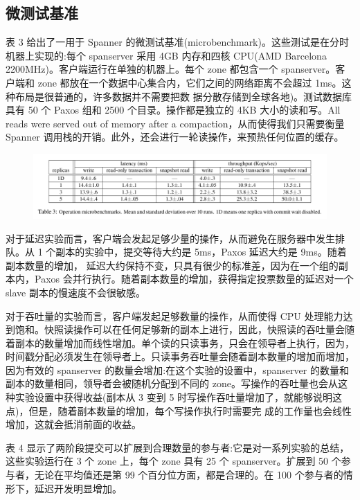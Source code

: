 \documentclass[letterpaper,twocolumn,10pt]{article}
\begin{document}
\subsection{微测试基准}
表 3 给出了一用于 Spanner 的微测试基准(microbenchmark)。这些测试是在分时机器上实现的:每个 spanserver 采用 4GB 内存和四核 CPU(AMD Barcelona 2200MHz)。客户端运行在单独的机器上。每个 zone 都包含一个 spanserver。客户端和 zone 都放在一个数据中心集合内，它们之间的网络距离不会超过 1ms。这种布局是很普通的，许多数据并不需要把数 据分散存储到全球各地)。测试数据库具有 50 个 Paxos 组和 2500 个目录。操作都是独立的 4KB 大小的读和写。All reads were served out of memory after a compaction，从而使得我们只需要衡量 Spanner 调用栈的开销。此外，还会进行一轮读操作，来预热任何位置的缓存。

\begin{figure}[htbp]
\begin{center}
\includegraphics[width=1\textwidth]{./table_3.png}
\label{Table3}
\end{center}
\end{figure}

对于延迟实验而言，客户端会发起足够少量的操作，从而避免在服务器中发生排队。从 1 个副本的实验中，提交等待大约是 5ms，Paxos 延迟大约是 9ms。随着副本数量的增加， 延迟大约保持不变，只具有很少的标准差，因为在一个组的副本内，Paxos 会并行执行。随着副本数量的增加，获得指定投票数量的延迟对一个 slave 副本的慢速度不会很敏感。

对于吞吐量的实验而言，客户端发起足够数量的操作，从而使得 CPU 处理能力达到饱和。快照读操作可以在任何足够新的副本上进行，因此，快照读的吞吐量会随着副本的数量增加而线性增加。单个读的只读事务，只会在领导者上执行，因为，时间戳分配必须发生在领导者上。只读事务吞吐量会随着副本数量的增加而增加，因为有效的 spanserver 的数量会增加:在这个实验的设置中，spanserver 的数量和副本的数量相同，领导者会被随机分配到不同的 zone。写操作的吞吐量也会从这种实验设置中获得收益(副本从 3 变到 5 时写操作吞吐量增加了，就能够说明这点)，但是，随着副本数量的增加，每个写操作执行时需要完 成的工作量也会线性增加，这就会抵消前面的收益。

表 4 显示了两阶段提交可以扩展到合理数量的参与者:它是对一系列实验的总结，这些实验运行在 3 个 zone 上，每个 zone 具有 25 个 spanserver。扩展到 50 个参与者，无论在平均值还是第 99 个百分位方面，都是合理的。在 100 个参与者的情形下，延迟开发明显增加。
\end{document}
